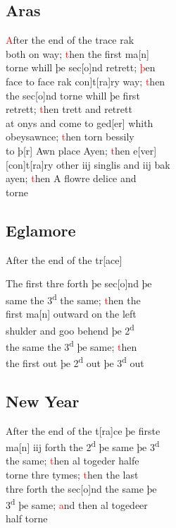 \documentclass[12pt,letter]{article} %
\newcommand{\red}[1]{\textcolor{red}{#1}}
\newcommand{\srcpg}[1]{
    \noindent{
        \color{Gray}{\rule[0.5ex]{\linewidth}{1pt}~#1} 
    
    }
}
\begin{document}
\subsection{Aras}
\red{A}fter the end of the trace rak\\
both on way; \red{t}hen the first ma{[}n{]}\\
torne whill þe sec{[}o{]}nd retrett; \red{þ}en\\
face to face rak \marginnote{2}{[}con{]}t{[}ra{]}ry way; \red{t}hen\\
the sec{[}o{]}nd torne whill þe first\\
retrett; \red{t}hen trett and retrett\\
at onys and come to ged{[}er{]} whith\\
obeysawnce; \red{t}hen torn bessily\\
to þ{[}r{]} Awn place Ayen; \red{t}hen e{[}ver{]}\\
{[}con{]}t{[}ra{]}ry other iij singlis and iij bak\\
ayen; \red{t}hen A flowre delice and\\
torne

\subsection{Eglamore}
After the end of the tr{[}ace{]} 
\srcpg{65}
The first thre forth þe sec{[}o{]}nd þe\\
same the 3\textsuperscript{d} the same; \red{t}hen the\\
first ma{[}n{]} outward on the left\\
shulder and goo behend þe 2\textsuperscript{d}\\
the same the 3\textsuperscript{d} þe same; \red{t}hen\\
the first out þe 2\textsuperscript{d} out þe 3\textsuperscript{d} out

\subsection{New Year}
After the end of the t{[}ra{]}ce þe firste\\
ma{[}n{]} iij forth the 2\textsuperscript{d} þe same þe 3\textsuperscript{d}\\
the same; \red{t}hen al togeder halfe\\
torne thre tymes; \red{t}hen the last\\
thre forth the sec{[}o{]}nd the same þe\\
3\textsuperscript{d} þe same; \red{a}nd then al togedeer\\
half torne
\end{document}
